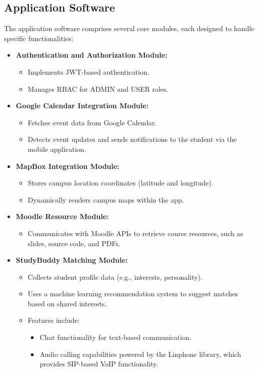 \documentclass[12pt]{article}
\begin{document}
\pagebreak

\subsection{Application Software}  
The application software comprises several core modules, each designed to handle specific functionalities:  

\begin{itemize}  
    \item \textbf{Authentication and Authorization Module:}  
    \begin{itemize}  
        \item Implements JWT-based authentication.  
        \item Manages RBAC for ADMIN and USER roles.  
    \end{itemize}  

    \item \textbf{Google Calendar Integration Module:}  
    \begin{itemize}  
        \item Fetches event data from Google Calendar.  
        \item Detects event updates and sends notifications to the student via the mobile application.  
    \end{itemize}  

    \item \textbf{MapBox Integration Module:}  
    \begin{itemize}  
        \item Stores campus location coordinates (latitude and longitude).  
        \item Dynamically renders campus maps within the app.  
    \end{itemize}  

    \item \textbf{Moodle Resource Module:}  
    \begin{itemize}  
        \item Communicates with Moodle APIs to retrieve course resources, such as slides, source code, and PDFs.  
    \end{itemize}  

    \item \textbf{StudyBuddy Matching Module:}  
    \begin{itemize}  
        \item Collects student profile data (e.g., interests, personality).  
        \item Uses a machine learning recommendation system to suggest matches based on shared interests.  
        \item Features include:  
        \begin{itemize}  
            \item Chat functionality for text-based communication.  
            \item Audio calling capabilities powered by the Linphone library, which provides SIP-based VoIP functionality.  
        \end{itemize}  
    \end{itemize}  


\end{itemize}
\end{document}
